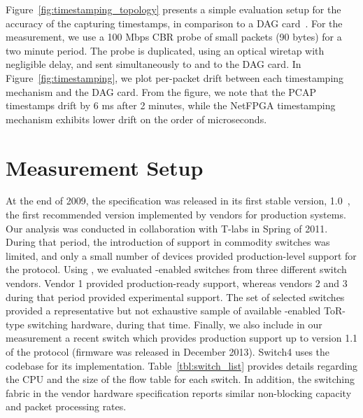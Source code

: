 Figure~\ref{fig:timestamping_topology} presents a simple evaluation setup for
the accuracy of the \oflops capturing timestamps, in comparison to a DAG
card~. For the measurement, we use a 100 Mbps CBR probe of
small packets (90 bytes) for a two minute period. The probe is duplicated, using an optical
wiretap with negligible delay, and sent simultaneously to \oflops and to the DAG
card. In Figure~\ref{fig:timestamping}, we plot per-packet drift between each
\oflops timestamping mechanism and the DAG card. From the figure, we note that
the PCAP timestamps drift by 6 ms after 2 minutes, while the NetFPGA
timestamping mechanism exhibits lower drift on the order of microseconds.




\section{Measurement Setup}\label{sec:oflops-switches}

At the end of 2009, the \of specification was released in its first
stable version, 1.0~, the first recommended version
implemented by vendors for production systems.  Our analysis was conducted in
collaboration with T-labs in Spring of 2011. During that period, the
introduction of \of support in commodity switches was limited, and only a small
number of devices provided production-level support for the protocol.  Using
\oflops, we evaluated \of-enabled switches from three different switch vendors.
Vendor 1 provided production-ready \of support, whereas vendors 2 and 3 during
that period provided experimental \of support. The set of selected switches
provided a representative but not exhaustive sample of available \of-enabled
ToR-type switching hardware, during that time. Finally, we also include in our
measurement a recent \of switch which provides production support up
to version 1.1 of the protocol (firmware was released in December
2013).  Switch4 uses the \ovs codebase for its implementation. 
Table~\ref{tbl:switch_list} provides details regarding the CPU and the size of
the flow table for each switch. In addition, the switching fabric in the vendor
hardware specification reports similar non-blocking capacity and packet
processing rates. 

